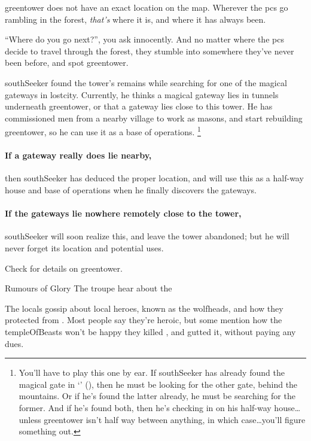 \Gls{greentower} does not have an exact location on the map.
Wherever the \glspl{pc} go \gls{rambling} in the forest, \textit{that's} where it is, and where it has always been.

``Where do you go next?'', you ask innocently.
And no matter where the \glspl{pc} decide to travel through the forest, they stumble into somewhere they've never been before, and spot \gls{greentower}.

\begin{exampletext}
  \Gls{southSeeker} found the tower's remains while searching for one of the magical gateways in \gls{lostcity}.
  Currently, he thinks a magical gateway lies in tunnels underneath \gls{greentower}, or that a gateway lies close to this tower.
  He has commissioned men from a nearby \gls{village} to work as masons, and start rebuilding \gls{greentower}, so he can use it as a base of operations.%
  \footnote{You'll have to play this one by ear.
  If \gls{southSeeker} has already found the magical gate in `' (), then he must be looking for the other gate, behind the mountains.
  Or if he's found the latter already, he must be searching for the former.
  And if he's found both, then he's checking in on his half-way house\ldots unless \gls{greentower} isn't half way between anything, in which case\ldots you'll figure something out.}
\end{exampletext}

\paragraph{If a gateway really does lie nearby,}
then \gls{southSeeker} has deduced the proper location, and will use this as a half-way house and base of operations when he finally discovers the gateways.

\paragraph{If the gateways lie nowhere remotely close to the tower,}
\gls{southSeeker} will soon realize this, and leave the tower abandoned; but he will never forget its location and potential uses.

Check  for details on \gls{greentower}.

{\squash Rumours of Glory}%
{The troupe hear about the }%

The locals gossip about local heroes, known as the \glspl{wolfhead}, and how they protected  from .
Most people say they're heroic, but some mention how the \gls{templeOfBeasts} won't be happy they killed , and gutted it, without paying any dues.

